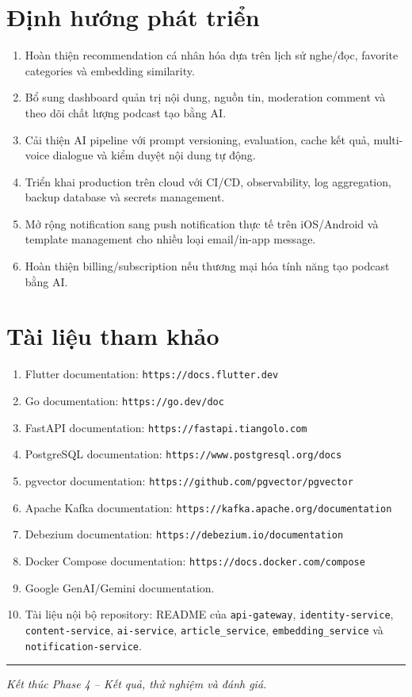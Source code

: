 \documentclass[14pt,a4paper,oneside]{extreport}
\begin{document}
\section{Định hướng phát triển}
\label{sec:dinh-huong}

\begin{enumerate}[leftmargin=2cm]
  \item Hoàn thiện recommendation cá nhân hóa dựa trên lịch sử nghe/đọc, favorite categories và embedding similarity.
  \item Bổ sung dashboard quản trị nội dung, nguồn tin, moderation comment và theo dõi chất lượng podcast tạo bằng AI.
  \item Cải thiện AI pipeline với prompt versioning, evaluation, cache kết quả, multi-voice dialogue và kiểm duyệt nội dung tự động.
  \item Triển khai production trên cloud với CI/CD, observability, log aggregation, backup database và secrets management.
  \item Mở rộng notification sang push notification thực tế trên iOS/Android và template management cho nhiều loại email/in-app message.
  \item Hoàn thiện billing/subscription nếu thương mại hóa tính năng tạo podcast bằng AI.
\end{enumerate}

\section{Tài liệu tham khảo}
\label{sec:tai-lieu-tham-khao}

\begin{enumerate}[leftmargin=2cm]
  \item Flutter documentation: \texttt{https://docs.flutter.dev}
  \item Go documentation: \texttt{https://go.dev/doc}
  \item FastAPI documentation: \texttt{https://fastapi.tiangolo.com}
  \item PostgreSQL documentation: \texttt{https://www.postgresql.org/docs}
  \item pgvector documentation: \texttt{https://github.com/pgvector/pgvector}
  \item Apache Kafka documentation: \texttt{https://kafka.apache.org/documentation}
  \item Debezium documentation: \texttt{https://debezium.io/documentation}
  \item Docker Compose documentation: \texttt{https://docs.docker.com/compose}
  \item Google GenAI/Gemini documentation.
  \item Tài liệu nội bộ repository: README của \texttt{api-gateway}, \texttt{identity-service}, \texttt{content-service}, \texttt{ai-service}, \texttt{article\_service}, \texttt{embedding\_service} và \texttt{notification-service}.
\end{enumerate}

\vspace{1cm}
\noindent\rule{\textwidth}{0.4pt}

\noindent
\textit{Kết thúc Phase 4 -- Kết quả, thử nghiệm và đánh giá.}
\end{document}
